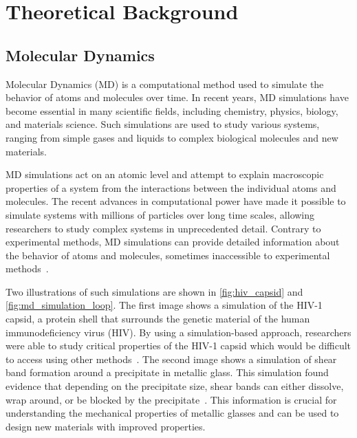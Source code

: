 \chapter{Theoretical Background}
\label{sec:theoretical_background}


\section{Molecular Dynamics}

Molecular Dynamics (MD) is a computational method used to simulate the behavior of atoms and molecules over time. In recent years, MD simulations have become essential in many scientific fields, including chemistry, physics, biology, and materials science. Such simulations are used to study various systems, ranging from simple gases and liquids to complex biological molecules and new materials.

MD simulations act on an atomic level and attempt to explain macroscopic properties of a system from the interactions between the individual atoms and molecules. The recent advances in computational power have made it possible to simulate systems with millions of particles over long time scales, allowing researchers to study complex systems in unprecedented detail. Contrary to experimental methods, MD simulations can provide detailed information about the behavior of atoms and molecules, sometimes inaccessible to experimental methods~\cite{Perilla2017}.

Two illustrations of such simulations are shown in \autoref{fig:hiv_capsid} and \autoref{fig:md_simulation_loop}. The first image shows a simulation of the HIV-1 capsid, a protein shell that surrounds the genetic material of the human immunodeficiency virus (HIV). By using a simulation-based approach, researchers were able to study critical properties of the HIV-1 capsid which would be difficult to access using other methods~\cite{Perilla2017}. The second image shows a simulation of shear band formation around a precipitate in metallic glass. This simulation found evidence that depending on the precipitate size, shear bands can either dissolve, wrap around, or be blocked by the precipitate~\cite{Brink2016}. This information is crucial for understanding the mechanical properties of metallic glasses and can be used to design new materials with improved properties.


